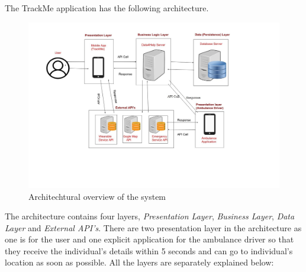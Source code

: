 \qquad The TrackMe application has the following architecture. 
\begin{figure}[H]
	\begin{center}
		\includegraphics[width=\textwidth]{./DD_Diagrams/ArchitechuralView.jpg}
      	\caption{Architechtural overview of the system}
        \label{TrackMe_arc}
	\end{center}
\end{figure}
The architecture contains four layers, \textit{Presentation Layer}, \textit{Business Layer},\textit{ Data Layer} and \textit{External API's}. There are two presentation layer in the architecture as one is for the user and one explicit application for the ambulance driver so that they receive the individual's details within 5 seconds and can go to individual's location as soon as possible. All the layers are separately explained below:
